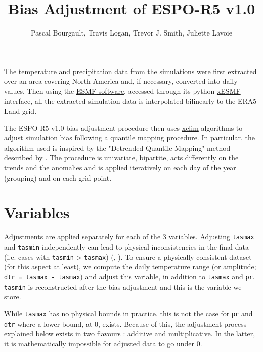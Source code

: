 \documentclass[letterpaper,10pt]{article}
\begin{document}
\title{Bias Adjustment of ESPO-R5 v1.0}
\author{Pascal Bourgault, Travis Logan, Trevor J. Smith, Juliette Lavoie}
\maketitle

The temperature and precipitation data from the simulations were first extracted over an area covering North America and, if necessary, converted into daily values.
Then using the \href{https://earthsystemmodeling.org/regrid/}{ESMF software}, accessed through its python \href{https://xesmf.readthedocs.io/en/latest/}{xESMF} interface, all the extracted simulation data is interpolated bilinearly to the ERA5-Land grid.

The ESPO-R5 v1.0 bias adjustment procedure then uses \href{https://xclim.readthedocs.io/en/stable/sdba.html}{xclim} algorithms to adjust simulation bias following a quantile mapping procedure.
In particular, the algorithm used is inspired by the "Detrended Quantile Mapping" method described by \cite{Cannon15}.
The procedure is univariate, bipartite, acts differently on the trends and the anomalies and is applied iteratively on each day of the year (grouping) and on each grid point.

\section{Variables}
Adjustments are applied separately for each of the 3 variables.
Adjusting \texttt{tasmax} and \texttt{tasmin} independently can lead to physical inconsistencies in the final data (i.e. cases with \texttt{tasmin} > \texttt{tasmax})  (\cite{Thrasher12}, \cite{Agbazo20}).
To ensure a physically consistent dataset (for this aspect at least), we compute the daily temperature range (or amplitude; \texttt{dtr = tasmax - tasmax}) and adjust this variable, in addition to \texttt{tasmax} and \texttt{pr}.
\texttt{tasmin} is reconstructed after the bias-adjustment and this is the variable we store.

While \texttt{tasmax} has no physical bounds in practice, this is not the case for \texttt{pr} and \texttt{dtr} where a lower bound, at 0, exists.
Because of this, the adjustment process explained below exists in two flavours : additive and multiplicative.
In the latter, it is mathematically impossible for adjusted data to go under 0.
\end{document}
